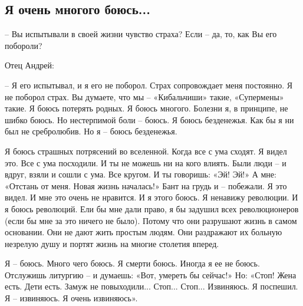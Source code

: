  
 
 
 
 
\subsection{Я очень многого боюсь...}
\label{sec:22_11_2021.yz.tkachev_andrej.protoierej.1.strah}


– Вы испытывали в своей жизни чувство страха? Если – да, то, как Вы его
побороли?

Отец Андрей:

– Я его испытывал, и я его не поборол. Страх сопровождает меня постоянно. Я не
поборол страх. Вы думаете, что мы – «Кибальчиши» такие, «Супермены» такие. Я
боюсь потерять родных. Я боюсь многого. Болезни я, в принципе, не шибко боюсь.
Но нестерпимой боли – боюсь. Я боюсь безденежья. Как бы я ни был не
сребролюбив. Но я – боюсь безденежья.


Я боюсь страшных потрясений во вселенной. Когда все с ума сходят. Я видел это.
Все с ума посходили. И ты не можешь ни на кого влиять. Были люди – и вдруг,
взяли и сошли с ума. Все кругом. И ты говоришь: «Эй! Эй!» А мне: «Отстань от
меня. Новая жизнь началась!» Бант на грудь и – побежали. Я это видел. И мне это
очень не нравится. И я этого боюсь. Я ненавижу революции. И я боюсь революций.
Ели бы мне дали право, я бы задушил всех революционеров (если бы мне за это
ничего не было). Потому что они разрушают жизнь в самом основании. Они не дают
жить простым людям. Они раздражают их больную незрелую душу и портят жизнь на
многие столетия вперед.

Я – боюсь. Много чего боюсь. Я смерти боюсь. Иногда я ее не боюсь. Отслужишь
литургию – и думаешь: «Вот, умереть бы сейчас!» Но: «Стоп! Жена есть. Дети
есть. Замуж не повыходили... Стоп... Стоп... Извиняюсь. Я поспешил. Я –
извиняюсь. Я очень извиняюсь».

